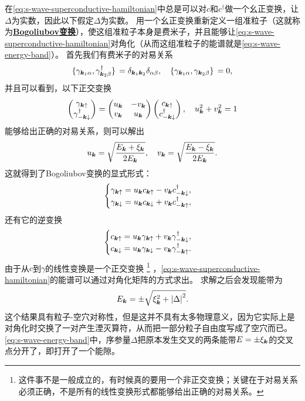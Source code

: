 \documentclass[hyperref, UTF8, a4paper]{ctexart}
\newcommand*{\concept}[1]{\underline{\textbf{#1}}}
\begin{document}
在\eqref{eq:s-wave-superconductive-hamiltonian}中总是可以对${c}$和${c}^\dagger$做一个幺正变换，让$\Delta$为实数，因此以下假定$\Delta$为实数。
用一个幺正变换重新定义一组准粒子（这就称为\concept{Bogoliubov变换}），使这组准粒子本身是费米子，并且能够让\eqref{eq:s-wave-superconductive-hamiltonian}对角化（从而这组准粒子的能谱就是\eqref{eq:s-wave-energy-band}）。
首先我们有费米子的对易关系
\[
    \acomm*{{\gamma}_{\vb*{k}_1 \alpha}}{{\gamma}^\dagger_{\vb*{k}_2 \beta}} = \delta_{\vb*{k}_1 \vb*{k}_2} \delta_{\alpha \beta}, \quad \acomm*{{\gamma}_{\vb*{k}_1 \alpha}}{{\gamma}_{\vb*{k}_2 \beta}} = 0,
\]
并且可以看到，以下正交变换
\[
    \pmqty{{\gamma}_{\vb*{k} \uparrow} \\ {\gamma}^\dagger_{-\vb*{k} \downarrow}} = \pmqty{u_{\vb*{k}} & -v_{\vb*{k}} \\ v_{\vb*{k}} & u_{\vb*{k}}} \pmqty{{c}_{\vb*{k} \uparrow} \\ {c}^\dagger_{-\vb*{k} \downarrow}},
    \quad u_{\vb*{k}}^2 + v_{\vb*{k}}^2 = 1
\]
能够给出正确的对易关系，则可以解出
\begin{equation}
    u_{\vb*{k}} = \sqrt{\frac{E_{\vb*{k}} + \xi_{\vb*{k}}}{2 E_{\vb*{k}}}}, \quad v_{\vb*{k}} = \sqrt{\frac{E_{\vb*{k}} - \xi_{\vb*{k}}}{2 E_{\vb*{k}}}}.
\end{equation}
这就得到了Bogoliubov变换的显式形式：
\begin{equation}
    \begin{cases}
        {\gamma}_{\vb*{k} \uparrow} = u_{\vb*{k}} {c}_{\vb*{k} \uparrow} - v_{\vb*{k}} {c}_{-\vb*{k} \downarrow}^\dagger, \\
        {\gamma}_{\vb*{k} \downarrow} = u_{\vb*{k}} {c}_{\vb*{k} \downarrow} + v_{\vb*{k}} {c}_{-\vb*{k} \uparrow}^\dagger,
    \end{cases}
    \label{eq:bogoliubov-transform}
\end{equation}
还有它的逆变换
\begin{equation}
    \begin{cases}
        {c}_{\vb*{k} \uparrow} = u_{\vb*{k}} {\gamma}_{\vb*{k} \uparrow} + v_{\vb*{k}} {\gamma}_{-\vb*{k} \downarrow}^\dagger, \\
        {c}_{\vb*{k} \downarrow} = u_{\vb*{k}} {\gamma}_{\vb*{k} \downarrow} - v_{\vb*{k}} {\gamma}_{-\vb*{k} \uparrow}^\dagger.
    \end{cases}
    \label{eq:inverse-bogoliubov-transform}
\end{equation}
由于从${c}$到${\gamma}$的线性变换是一个正交变换%
\footnote{这件事不是一般成立的，有时候真的要用一个非正交变换；关键在于对易关系必须正确，不是所有的线性变换形式都能够给出正确的对易关系。}%
，\eqref{eq:s-wave-superconductive-hamiltonian}的能谱可以通过对角化矩阵的方式求出。
求解之后会发现能带为
\begin{equation}
    E_{\vb*{k}} = \pm \sqrt{ \xi_{\vb*{k}}^2 + \abs{\Delta}^2 }.
    \label{eq:s-wave-energy-band}
\end{equation}
这个结果具有粒子-空穴对称性，但是这并不具有太多物理意义，因为它实际上是对角化时交换了一对产生湮灭算符，从而把一部分粒子自由度写成了空穴而已。
\eqref{eq:s-wave-energy-band}中，序参量$\Delta$把原本发生交叉的两条能带$E=\pm \xi_{\vb*{k}}$的交叉点分开了，即打开了一个能隙。
\end{document}
